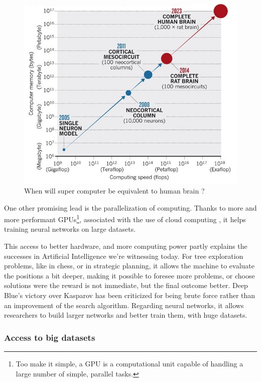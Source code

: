 \documentclass[12pt]{article}
\begin{document}
\begin{figure}[ht]
    \centering
    \includegraphics[width=\textwidth]{fartogo}
    \caption{When will super computer be equivalent to human brain ?}
    \label{fig:fartogo}
\end{figure}


One other promising lead is the parallelization of computing. Thanks to more and
more performant GPUs\footnote{Too make it simple, a GPU is a computational unit
capable of handling a large number of simple, parallel tasks.}, associated  with  the use of cloud
computing \cite{cloud}, it helps training neural networks on large datasets.

This access to better hardware, and more computing power partly explains the
successes in Artificial Intelligence we're witnessing today. For tree
exploration problems, like in chess, or in strategic planning, it allows the
machine to evaluate the positions a bit deeper, making it possible to foresee
more problems, or choose solutions were the reward is not immediate, but the
final outcome better. Deep Blue's victory  over Kasparov has been criticized for
being brute force rather than an improvement of the search algorithm. Regarding
neural networks, it allows researchers to build larger networks and better train
them, with huge datasets.

\subsubsection{Access to big datasets}
\end{document}
